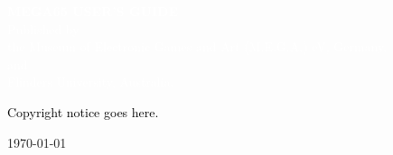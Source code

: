 \documentclass[twoside]{book}
\makeatletter
\def\cleardoublepage{\clearpage\if@twoside
\ifodd\c@page
\else\hbox{}\thispagestyle{empty}\newpage
\if@twocolumn\hbox{}\newpage\fi\fi\fi}
\makeatother
\begin{document}



%

\cleardoublepage

  \begin{titlepage}
    \pagecolor{blue}
     \begin{center}
       {
         \large
         \vspace*{2cm}
               {\Huge\textcolor{white}{\bf{MEGA65 USER'S GUIDE}}}\\
             \vspace{\fill}
                 {\textcolor{white}{Published by \\ the Museum of Electronic Games and Art (M.E.G.A.) eV, Germany.\\and\\Flinders University, Australia.}}
       }
     \end{center}
   \end{titlepage}

  \pagecolor{white}\textcolor{black}
   {\vfill Copyright notice goes here.}
   \par\today



\pagecolor{white}










\begin{appendices}
\end{appendices}





\end{document}
